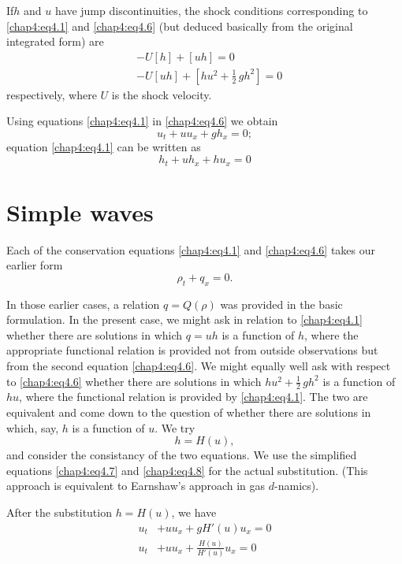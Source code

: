 If\pageoriginale $h$ and $u$ have jump discontinuities, the shock conditions corresponding to \eqref{chap4:eq4.1} and \eqref{chap4:eq4.6} (but deduced basically from the original integrated form) are 
\begin{align*}
& -U[h]+[uh]=0\\
& -U[uh]+\left[hu^2+\frac{1}{2}\,gh^2\right]=0
\end{align*}
respectively, where $U$ is the shock velocity.

Using equations \eqref{chap4:eq4.1} in \eqref{chap4:eq4.6} we obtain
\begin{equation}
u_t+uu_x+gh_x=0;\tag{4.7}\label{chap4:eq4.7}
\end{equation}
equation \eqref{chap4:eq4.1} can be written as 
\begin{equation}
h_t+uh_x+hu_x=0\tag{4.8}\label{chap4:eq4.8}
\end{equation}

\section{Simple waves}\label{chap4:sec4.2}

Each of the conservation equations \eqref{chap4:eq4.1} and \eqref{chap4:eq4.6} takes our earlier form
$$
\rho_t+q_x=0.
$$

In those earlier cases, a relation $q=Q(\rho)$ was provided in the basic formulation. In the present case, we might ask in relation to \eqref{chap4:eq4.1} whether there are solutions in which $q=uh$ is a function of $h$, where the appropriate functional relation is provided not from outside observations but from the second equation \eqref{chap4:eq4.6}. We might equally well ask with respect to \eqref{chap4:eq4.6} whether there are solutions in which $hu^2+\frac{1}{2}\,gh^2$ is a function of $hu$, where the functional relation is provided by \eqref{chap4:eq4.1}. The two are equivalent and come down to the question of whether there are solutions in which, say, $h$ is a function of $u$. We try 
$$
h=H(u),
$$\pageoriginale
and consider the consistancy of the two equations. We use the simplified equations \eqref{chap4:eq4.7} and \eqref{chap4:eq4.8} for the actual substitution. (This approach is equivalent to Earnshaw's approach in gas $d$-namics).

After the substitution $h=H(u)$, we have 
\begin{align}
u_t & + uu_x + gH'(u)u_x=0\tag*{$(4.7)'$}\label{chap4:eq4.7'}\\
u_t & + uu_x +\frac{H(u)}{H'(u)}u_x=0\tag*{$(4.8)'$}\label{chap4:eq4.8'}
\end{align}

